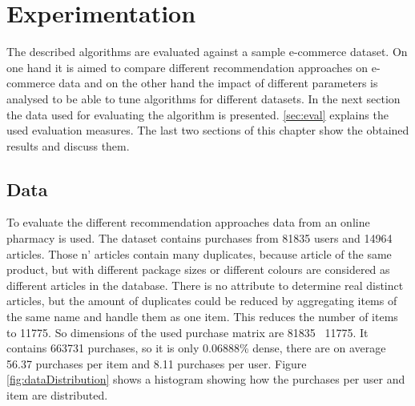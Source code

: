 \documentclass[10pt]{reportMaster}
\begin{document}







\chapter{Experimentation}
The described algorithms are evaluated against a sample e-commerce dataset.
On one hand it is aimed to compare different recommendation approaches on e-commerce data and on the other hand the impact of different parameters is analysed to be able to tune algorithms for different datasets.
In the next section the data used for evaluating the algorithm is presented.
\ref{sec:eval} explains the used evaluation measures.
The last two sections of this chapter show the obtained results and discuss them.

\section{Data}
To evaluate the different recommendation approaches data from an online pharmacy is used.
The dataset contains purchases from 81835 users and 14964 articles.
Those n' articles contain many duplicates, because article of the same product, but with different package sizes or different colours are considered as different articles in the database.
There is no attribute to determine real distinct articles, but the amount of duplicates could be reduced by aggregating items of the same name and handle them as one item.
This reduces the number of items to 11775.
So dimensions of the used purchase matrix are 81835 \texttimes \ 11775.
It contains 663731 purchases, so it is only 0.06888\% dense, there are on average 56.37 purchases per item and 8.11 purchases per user. %
Figure \ref{fig:dataDistribution} shows a histogram showing how the purchases per user and item are distributed.

\end{document}
